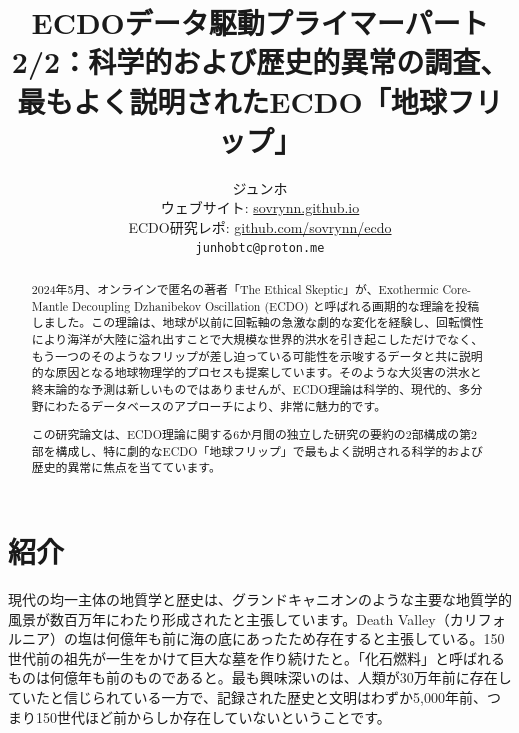 \documentclass[10pt,twocolumn,letterpaper]{article}
\begin{document}
\title{ECDOデータ駆動プライマーパート2/2：科学的および歴史的異常の調査、最もよく説明されたECDO「地球フリップ」}

\author{ジュンホ\\
ウェブサイト: \href{https://sovrynn.github.io}{sovrynn.github.io}\\
ECDO研究レポ: \href{https://github.com/sovrynn/ecdo}{github.com/sovrynn/ecdo}\\
{\tt\small junhobtc@proton.me}
}

\maketitle

\begin{abstract}
2024年5月、オンラインで匿名の著者「The Ethical Skeptic」\cite{0}が、Exothermic Core-Mantle Decoupling Dzhanibekov Oscillation (ECDO) \cite{1}と呼ばれる画期的な理論を投稿しました。この理論は、地球が以前に回転軸の急激な劇的な変化を経験し、回転慣性により海洋が大陸に溢れ出すことで大規模な世界的洪水を引き起こしただけでなく、もう一つのそのようなフリップが差し迫っている可能性を示唆するデータと共に説明的な原因となる地球物理学的プロセスも提案しています。そのような大災害の洪水と終末論的な予測は新しいものではありませんが、ECDO理論は科学的、現代的、多分野にわたるデータベースのアプローチにより、非常に魅力的です。

この研究論文は、ECDO理論に関する6か月間の独立した研究\cite{2,20}の要約の2部構成の第2部を構成し、特に劇的なECDO「地球フリップ」で最もよく説明される科学的および歴史的異常に焦点を当てています。

\end{abstract}


\section{紹介}

現代の均一主体の地質学と歴史は、グランドキャニオンのような主要な地質学的風景が数百万年にわたり形成されたと主張しています\cite{143}。Death Valley（カリフォルニア）の塩は何億年も前に海の底にあったため存在すると主張している\cite{144}。150世代前の祖先が一生をかけて巨大な墓を作り続けたと\cite{29,70}。「化石燃料」と呼ばれるものは何億年も前のものであると\cite{104}。最も興味深いのは、人類が30万年前に存在していたと信じられている一方で、記録された歴史と文明はわずか5,000年前、つまり150世代ほど前からしか存在していないということです\cite{145}。
\end{document}
